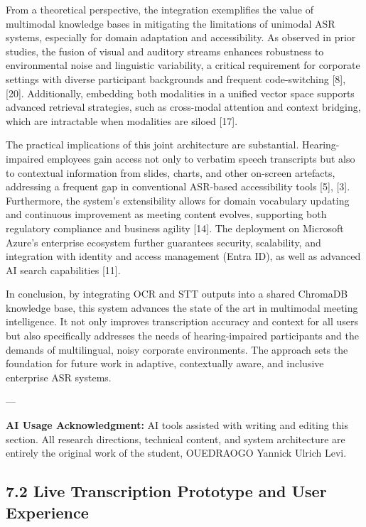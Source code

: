 \documentclass[12pt,a4paper]{article}
\begin{document}
From a theoretical perspective, the integration exemplifies the value of multimodal knowledge bases in mitigating the limitations of unimodal ASR systems, especially for domain adaptation and accessibility. As observed in prior studies, the fusion of visual and auditory streams enhances robustness to environmental noise and linguistic variability, a critical requirement for corporate settings with diverse participant backgrounds and frequent code-switching [8], [20]. Additionally, embedding both modalities in a unified vector space supports advanced retrieval strategies, such as cross-modal attention and context bridging, which are intractable when modalities are siloed [17].


The practical implications of this joint architecture are substantial. Hearing-impaired employees gain access not only to verbatim speech transcripts but also to contextual information from slides, charts, and other on-screen artefacts, addressing a frequent gap in conventional ASR-based accessibility tools [5], [3]. Furthermore, the system’s extensibility allows for domain vocabulary updating and continuous improvement as meeting content evolves, supporting both regulatory compliance and business agility [14]. The deployment on Microsoft Azure’s enterprise ecosystem further guarantees security, scalability, and integration with identity and access management (Entra ID), as well as advanced AI search capabilities [11].


In conclusion, by integrating OCR and STT outputs into a shared ChromaDB knowledge base, this system advances the state of the art in multimodal meeting intelligence. It not only improves transcription accuracy and context for all users but also specifically addresses the needs of hearing-impaired participants and the demands of multilingual, noisy corporate environments. The approach sets the foundation for future work in adaptive, contextually aware, and inclusive enterprise ASR systems.


---


\textbf{AI Usage Acknowledgment:} AI tools assisted with writing and editing this section. All research directions, technical content, and system architecture are entirely the original work of the student, OUEDRAOGO Yannick Ulrich Levi.


\subsection{7.2 Live Transcription Prototype and User Experience}
\end{document}
